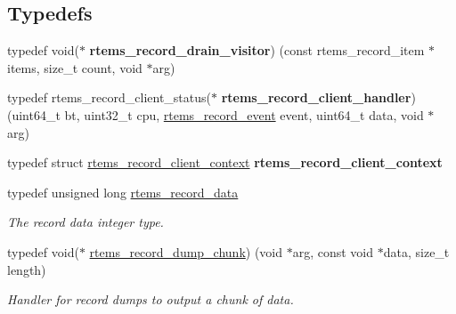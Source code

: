 \subsection*{Typedefs}
\begin{DoxyCompactItemize}
\item 
\mbox{\label{group__RTEMSRecord_ga345bd3a5e20c25469f96beadff42d4b8}} 
typedef void($\ast$ {\bfseries rtems\+\_\+record\+\_\+drain\+\_\+visitor}) (const rtems\+\_\+record\+\_\+item $\ast$items, size\+\_\+t count, void $\ast$arg)
\item 
\mbox{\label{group__RTEMSRecord_gab12eecd19c328916bdf4301544ab4e02}} 
typedef rtems\+\_\+record\+\_\+client\+\_\+status($\ast$ {\bfseries rtems\+\_\+record\+\_\+client\+\_\+handler}) (uint64\+\_\+t bt, uint32\+\_\+t cpu, \mbox{\hyperlink{group__RTEMSRecord_gac748f47c13acd7d0595694ed7f19074b}{rtems\+\_\+record\+\_\+event}} event, uint64\+\_\+t data, void $\ast$arg)
\item 
\mbox{\label{group__RTEMSRecord_gabc59e7a85f01d4dba0152b83d41587d3}} 
typedef struct \mbox{\hyperlink{structrtems__record__client__context}{rtems\+\_\+record\+\_\+client\+\_\+context}} {\bfseries rtems\+\_\+record\+\_\+client\+\_\+context}
\item 
typedef unsigned long \mbox{\hyperlink{group__RTEMSRecord_gab483bd3ec735835dac6788b78c817eab}{rtems\+\_\+record\+\_\+data}}
\begin{DoxyCompactList}\small\item\em The record data integer type. \end{DoxyCompactList}\item 
typedef void($\ast$ \mbox{\hyperlink{group__RTEMSRecord_gad5d67c09a47fe0f93067be3667db7ce0}{rtems\+\_\+record\+\_\+dump\+\_\+chunk}}) (void $\ast$arg, const void $\ast$data, size\+\_\+t length)
\begin{DoxyCompactList}\small\item\em Handler for record dumps to output a chunk of data. \end{DoxyCompactList}\end{DoxyCompactItemize}
